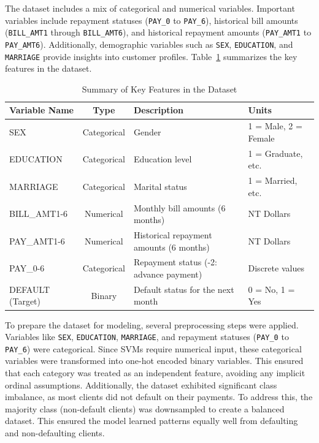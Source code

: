 \documentclass{article}
\begin{document}
The dataset includes a mix of categorical and numerical variables. Important variables include repayment statuses (\texttt{PAY\_0} to \texttt{PAY\_6}), 
historical bill amounts (\texttt{BILL\_AMT1} through \texttt{BILL\_AMT6}), and historical repayment amounts (\texttt{PAY\_AMT1} to \texttt{PAY\_AMT6}). 
Additionally, demographic variables such as \texttt{SEX}, \texttt{EDUCATION}, and \texttt{MARRIAGE} provide insights into customer profiles. Table~\ref{variables_table} 
summarizes the key features in the dataset.

\begin{table}[H]
\centering
\caption{Summary of Key Features in the Dataset}
\label{variables_table}
\begin{tabular}{@{}lcll@{}}
\toprule
\textbf{Variable Name} & \textbf{Type} & \textbf{Description}                  & \textbf{Units}       \\ \midrule
SEX                    & Categorical   & Gender                                & 1 = Male, 2 = Female \\ 
EDUCATION              & Categorical   & Education level                       & 1 = Graduate, etc.   \\ 
MARRIAGE               & Categorical   & Marital status                        & 1 = Married, etc.    \\ 
BILL\_AMT1-6           & Numerical     & Monthly bill amounts (6 months)       & NT Dollars           \\ 
PAY\_AMT1-6            & Numerical     & Historical repayment amounts (6 months) & NT Dollars         \\ 
PAY\_0-6               & Categorical   & Repayment status (-2: advance payment) & Discrete values      \\ 
DEFAULT (Target)       & Binary        & Default status for the next month     & 0 = No, 1 = Yes      \\ \bottomrule
\end{tabular}
\end{table}

To prepare the dataset for modeling, several preprocessing steps were applied. Variables like \texttt{SEX}, \texttt{EDUCATION}, \texttt{MARRIAGE}, 
and repayment statuses (\texttt{PAY\_0} to \texttt{PAY\_6}) were categorical. Since SVMs require numerical input, these categorical variables 
were transformed into one-hot encoded binary variables. This ensured that each category was treated as an independent feature, avoiding any implicit ordinal assumptions. 
Additionally, the dataset exhibited significant class imbalance, as most clients did not default on their payments. To address this, the majority class (non-default clients) 
was downsampled to create a balanced dataset. This ensured the model learned patterns equally well from defaulting and non-defaulting clients.
\end{document}
